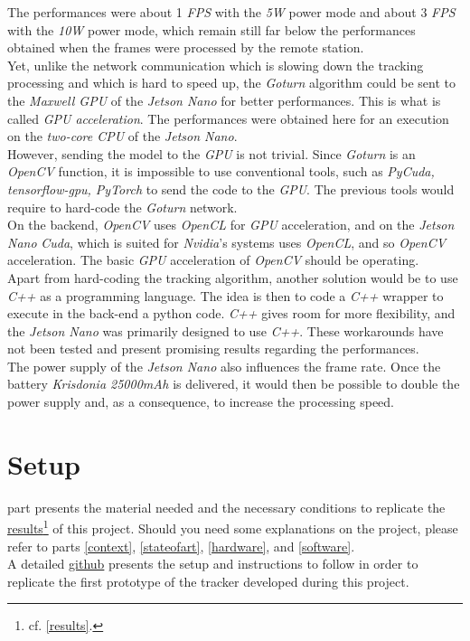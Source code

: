		The performances were about 1 \textit{FPS} with the \textit{5W} power mode
		and about 3 \textit{FPS} with the \textit{10W} power mode, which 
		remain still far below the performances obtained when the frames 
		were processed by the remote station.
		\\\indent Yet, unlike the network communication which is slowing down 
		the tracking processing and which is hard to speed up, the
		\textit{Goturn} algorithm could be sent to the \textit{Maxwell GPU}
		of the \textit{Jetson Nano} for better performances. 
		This is what is called \textit{GPU acceleration}. The performances
		were obtained here for an execution on the \textit{two-core CPU} of the 
		\textit{Jetson Nano}.
		\\\indent However, sending the model to the \textit{GPU} is not trivial.
		Since \textit{Goturn} is an \textit{OpenCV} function, it is impossible 
		to use conventional tools, such as \textit{PyCuda, tensorflow-gpu, PyTorch} 
		to send the code to the \textit{GPU}. The previous tools would require 
		to hard-code the \textit{Goturn} network.
		\\\indent On the backend, \textit{OpenCV} uses \textit{OpenCL} for \textit{GPU}
		acceleration, and on the \textit{Jetson Nano} \textit{Cuda}, which 
		is suited for \textit{Nvidia}'s systems uses \textit{OpenCL}, and so \textit{OpenCV}
		acceleration. The basic \textit{GPU} acceleration of \textit{OpenCV} should 
		be operating.
		\\\indent Apart from hard-coding the tracking algorithm, another solution would
		be to use \textit{C++} as a programming language. The idea is then 
		to code a \textit{C++} wrapper to execute in the back-end a python code.
		\textit{C++} gives room for more flexibility, and the \textit{Jetson Nano}
		was primarily designed to use \textit{C++}. These 
		workarounds have not been tested and present promising results regarding the performances.
		\\\indent The power supply of the \textit{Jetson Nano} also 
		influences the frame rate. Once the battery \textit{Krisdonia 25000mAh}
		is delivered, it would then be possible to double the power supply
		and, as a consequence, to increase the processing speed.
		
\chapter{Setup}\label{setup}

	 part presents the material needed and the 
	necessary conditions to replicate the \hyperref[results]{results}\footnote{cf. \vref{results}.} of
	this project. Should you need some explanations on the project, please
	refer to parts \vref{context}, \vref{stateofart}, \vref{hardware}, and \vref{software}.
	\\\indent A detailed \href{https://github.com/klipfel/tracker-v1}{github} presents the setup and
	instructions to follow in order to replicate the first prototype of the tracker developed during 
	this project.
	                           
